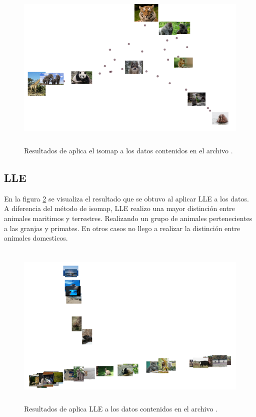 \begin{figure}[H]
    \centering
    \includegraphics[width=12cm,height=8cm]{Graphics/Isomap.png}
    \caption{Resultados de aplica el isomap a los datos contenidos en el archivo .}
    \label{fig:isomap}
\end{figure}

\subsection*{LLE}

En la figura \ref{fig:LLE} se visualiza el resultado que se obtuvo al aplicar LLE a los datos. A diferencia del método de isomap, LLE realizo una mayor distinción entre animales maritimos y terrestres. Realizando un grupo de animales pertenecientes a las granjas y primates. En otros casos no llego a realizar la distinción entre animales domesticos.

\begin{figure}[H]
    \centering
    \includegraphics[height=8cm,width=12cm]{Graphics/LLE.png}
    \caption{Resultados de aplica LLE a los datos contenidos en el archivo .}
    \label{fig:LLE}
\end{figure}

